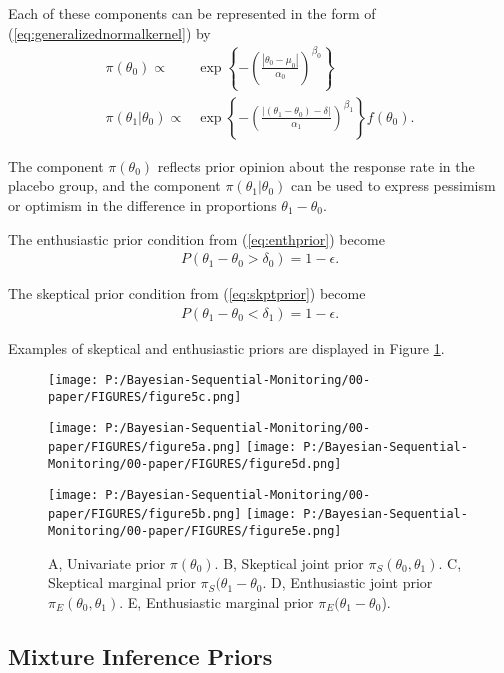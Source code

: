 \documentclass[12pt]{article}
\begin{document}
Each of these components can be represented in the form of (\ref{eq:generalizednormalkernel}) by
\begin{align}
\pi(\theta_0)\propto&\exp\left\{-\left(\frac{|\theta_0-\mu_0|}{\alpha_0}\right)^{\beta_0}\right\} \label{eq:genNormPlacebo}\\
\pi(\theta_1|\theta_0)\propto&\exp\left\{-\left(\frac{|(\theta_1-\theta_0)-\delta|}{\alpha_1}\right)^{\beta_1}\right\}f(\theta_0). \label{eq:genNormRd}
\end{align}

The component $\pi(\theta_0)$ reflects prior opinion about the response rate in the placebo group, and the component $\pi(\theta_1|\theta_0)$ can be used to express pessimism or optimism in the difference in proportions $\theta_1 - \theta_0$. 

The enthusiastic prior condition from (\ref{eq:enthprior}) become
\begin{align}\label{eq:ex2enthcondition}
P(\theta_1-\theta_0>\delta_0)=1-\epsilon.
\end{align}

The skeptical prior condition from (\ref{eq:skptprior}) become
\begin{align}\label{eq:ex2skptcondition}
P(\theta_1-\theta_0<\delta_1)=1-\epsilon.
\end{align}


Examples of skeptical and enthusiastic priors are displayed in Figure \ref{fig:figure5}.

\begin{figure}\begin{center}
\texttt{[image: P:/Bayesian-Sequential-Monitoring/00-paper/FIGURES/figure5c.png]}

\texttt{[image: P:/Bayesian-Sequential-Monitoring/00-paper/FIGURES/figure5a.png]}
\texttt{[image: P:/Bayesian-Sequential-Monitoring/00-paper/FIGURES/figure5d.png]}

\texttt{[image: P:/Bayesian-Sequential-Monitoring/00-paper/FIGURES/figure5b.png]}
\texttt{[image: P:/Bayesian-Sequential-Monitoring/00-paper/FIGURES/figure5e.png]}
\caption{A, Univariate prior $\pi(\theta_0)$. B, Skeptical joint prior $\pi_S(\theta_0,\theta_1)$. C, Skeptical marginal prior $\pi_S(\theta_1-\theta_0$. D, Enthusiastic joint prior $\pi_E(\theta_0,\theta_1)$. E, Enthusiastic marginal prior $\pi_E(\theta_1-\theta_0$).}
\label{fig:figure5}
 \end{center}\end{figure}
\subsection{Mixture Inference Priors}
\end{document}

